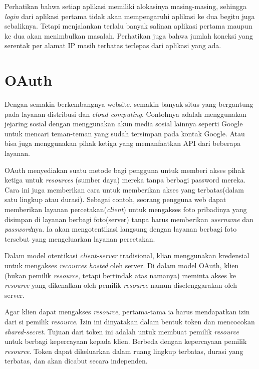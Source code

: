 Perhatikan bahwa setiap aplikasi memiliki alokasinya masing-masing, sehingga \textit{login} dari aplikasi pertama tidak akan mempengaruhi aplikasi ke dua begitu juga sebaliknya. Tetapi menjalankan terlalu banyak salinan aplikasi pertama maupun ke dua akan menimbulkan masalah. Perhatikan juga bahwa jumlah koneksi yang serentak per alamat IP masih terbatas terlepas dari aplikasi yang ada.

\section{OAuth}
\label{sec:oauth}
Dengan semakin berkembangnya website, semakin banyak situs yang bergantung pada layanan distribusi dan \textit{cloud computing}. Contohnya adalah menggunakan jejaring sosial dengan menggunakan akun media sosial lainnya seperti Google untuk mencari teman-teman yang sudah tersimpan pada kontak Google. Atau bisa juga menggunakan pihak ketiga yang memanfaatkan API dari beberapa layanan.

OAuth menyediakan suatu metode bagi pengguna untuk memberi akses pihak ketiga untuk \textit{resources} (sumber daya) mereka tanpa berbagi password mereka. Cara ini juga memberikan cara untuk memberikan akses yang terbatas(dalam satu lingkup atau durasi). Sebagai contoh, seorang pengguna web dapat memberikan layanan percetakan(\textit{client}) untuk mengakses foto pribadinya yang disimpan di layanan berbagi foto(server) tanpa harus memberikan \textit{username} dan \textit{password}nya. Ia akan mengotentikasi langsung dengan layanan berbagi foto tersebut yang mengeluarkan layanan percetakan.

Dalam model otentikasi \textit{client-server} tradisional, klian menggunakan kredensial untuk mengakses \textit{recources hosted} oleh server. Di dalam model OAuth, klien (bukan pemilik \textit{resource}, tetapi bertindak atas namanya) meminta akses ke \textit{resource} yang dikenalkan oleh pemilik \textit{resource} namun diselenggarakan oleh server.

Agar klien dapat mengakses \textit{resource}, pertama-tama ia harus mendapatkan izin dari si pemilik \textit{resource}. Izin ini dinyatakan dalam bentuk token dan mencocokan \textit{shared-secret}. Tujuan dari token ini adalah untuk membuat pemilik \textit{resource} untuk berbagi kepercayaan kepada klien. Berbeda dengan kepercayaan pemilik \textit{resource}. Token dapat dikeluarkan dalam ruang lingkup terbatas, durasi yang terbatas, dan akan dicabut secara independen.

